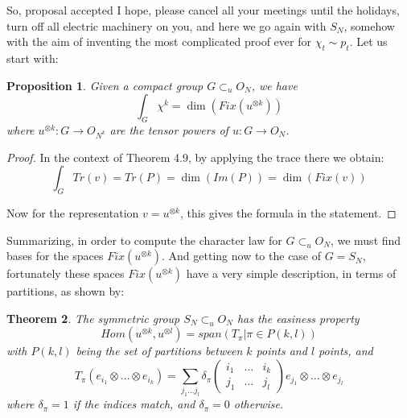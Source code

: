 \documentclass[12pt]{amsbook}
\newtheorem{theorem}{Theorem}[chapter]
\newtheorem{proposition}[theorem]{Proposition}
\begin{document}
So, proposal accepted I hope, please cancel all your meetings until the holidays, turn off all electric machinery on you, and here we go again with $S_N$, somehow with the aim of inventing the most complicated proof ever for $\chi_t\sim p_t$. Let us start with:

\begin{proposition}
Given a compact group $G\subset_uO_N$, we have
$$\int_G\chi^k=\dim\left(Fix(u^{\otimes k})\right)$$
where $u^{\otimes k}:G\to O_{N^k}$ are the tensor powers of $u:G\to O_N$.
\end{proposition}

\begin{proof}
In the context of Theorem 4.9, by applying the trace there we obtain:
$$\int_GTr(v)=Tr(P)=\dim(Im(P))=\dim(Fix(v))$$

Now for the representation $v=u^{\otimes k}$, this gives the formula in the statement.
\end{proof}

Summarizing, in order to compute the character law for $G\subset_uO_N$, we must find bases for the spaces $Fix(u^{\otimes k})$. And getting now to the case of $G=S_N$, fortunately these spaces $Fix(u^{\otimes k})$ have a very simple description, in terms of partitions, as shown by:


\begin{theorem}
The symmetric group $S_N\subset_uO_N$ has the easiness property
$$Hom(u^{\otimes k},u^{\otimes l})=span\left(T_\pi\Big|\pi\in P(k,l)\right)$$
with $P(k,l)$ being the set of partitions between $k$ points and $l$ points, and
$$T_\pi(e_{i_1}\otimes\ldots\otimes e_{i_k})=\sum_{j_1\ldots j_l}\delta_\pi
\begin{pmatrix}i_1&\ldots& i_k\\ j_1&\ldots& j_l\end{pmatrix}e_{j_1}\otimes\ldots\otimes e_{j_l}$$
where $\delta_\pi=1$ if the indices match, and $\delta_\pi=0$ otherwise.
\end{theorem}
\end{document}
